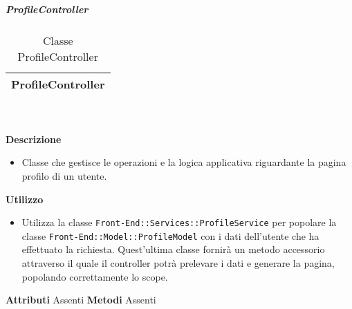 			\subparagraph{ProfileController} 
\begin{table}[ht]
\begin{center}
\bgroup
	\setlength{\arrayrulewidth}{0.6mm}
	\def\arraystretch{1}
		\begin{tabular}{ | p{12cm} | }
				\hline  
					\centerline{\textbf{ProfileController}}
		\\ \hline 
				\hline
				\hline
		
		\end{tabular}
\egroup
\caption{Classe ProfileController}
\end{center}
\end{table} \textbf{\\ \\ Descrizione}
\begin{itemize}
\item[] Classe che gestisce le operazioni e la logica applicativa riguardante la pagina profilo di un utente.
\end{itemize} 
\textbf{Utilizzo}
\begin{itemize}
\item[] Utilizza la classe \texttt{Front-End::Services::ProfileService} per popolare la classe \texttt{Front-End::Model::ProfileModel} con i dati dell'utente che ha effettuato la richiesta. Quest'ultima classe fornirà un metodo accessorio attraverso il quale il controller potrà prelevare i dati e generare la pagina, popolando correttamente lo scope.
\end{itemize}
\textbf{Attributi}
Assenti
\textbf{Metodi}
Assenti

